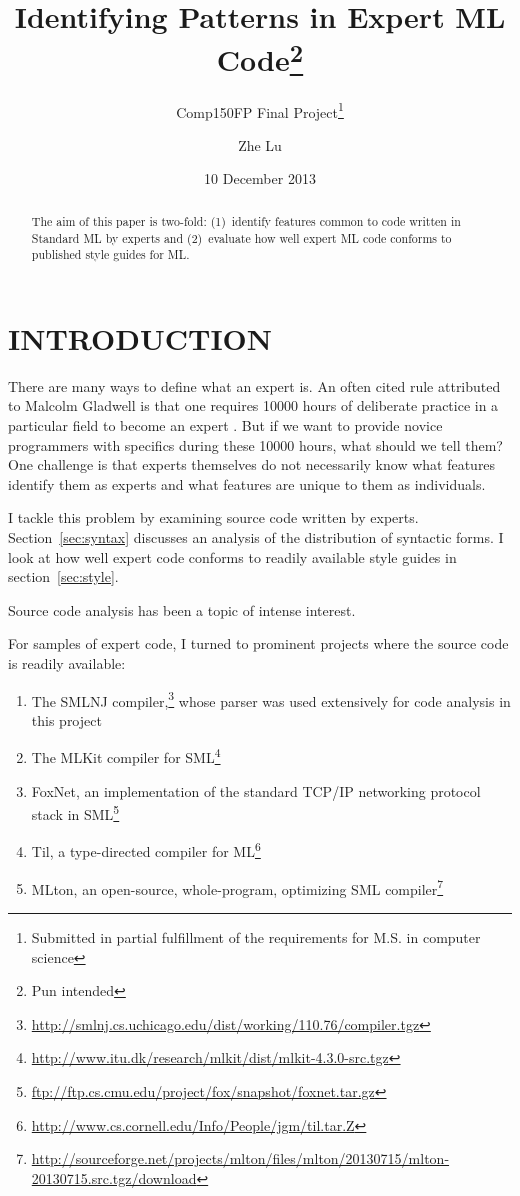 \documentclass[12pt,abstracton]{scrartcl}
\title{Identifying Patterns in Expert ML Code\footnote{Pun intended}}
\subtitle{Comp150FP Final Project\footnote{Submitted in partial fulfillment of the requirements for M.S. in computer science}}
\author{Zhe Lu}
\date{10 December 2013}
\begin{document}


\maketitle
\begin{abstract}
The aim of this paper is two-fold: (1)~identify features common to code written in Standard ML by experts and
(2)~evaluate how well expert ML code conforms to published style guides for ML.
\end{abstract}
\section{INTRODUCTION}
There are many ways to define what an expert is.
An often cited rule attributed to Malcolm Gladwell is that one requires 10000 hours of deliberate practice
in a particular field to become an expert \cite{Gla08}. But if we want to provide novice programmers
with specifics during these 10000 hours, what should we tell them? One challenge is that experts themselves
do not necessarily know what features identify them as experts and what features are unique to them as individuals.

I tackle this problem by examining source code written by experts. Section~\ref{sec:syntax} discusses an analysis
of the distribution of syntactic forms. I look at how well expert code conforms to readily available
style guides in section~\ref{sec:style}.

Source code analysis has been a topic of intense interest.

For samples of expert code, I turned to prominent projects where the source code is readily available:
\begin{enumerate}
\item The SMLNJ compiler,\footnote{\url{http://smlnj.cs.uchicago.edu/dist/working/110.76/compiler.tgz}} whose parser was used extensively for code analysis in this project
\item The MLKit compiler for SML\footnote{\url{http://www.itu.dk/research/mlkit/dist/mlkit-4.3.0-src.tgz}}
\item FoxNet, an implementation of the standard TCP/IP networking protocol stack in SML\footnote{\url{ftp://ftp.cs.cmu.edu/project/fox/snapshot/foxnet.tar.gz}}
\item Til, a type-directed compiler for ML\footnote{\url{http://www.cs.cornell.edu/Info/People/jgm/til.tar.Z}}
\item MLton, an open-source, whole-program, optimizing SML compiler\footnote{\url{http://sourceforge.net/projects/mlton/files/mlton/20130715/mlton-20130715.src.tgz/download}}
\end{enumerate}
\end{document}

